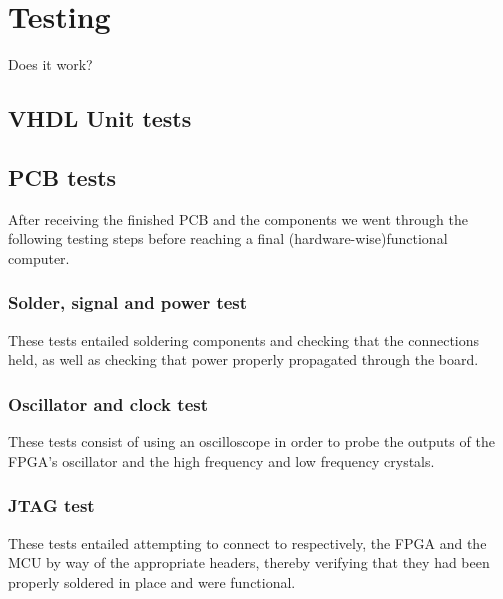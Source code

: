 \chapter{Testing}

Does it work?

\section{VHDL Unit tests}




\section{PCB tests}

After receiving the finished PCB and the components we went through the following testing steps before reaching a final (hardware-wise)functional computer.   

\subsection{Solder, signal and power test}
These tests entailed soldering components and checking that the connections held, as well as checking that power properly propagated through the board.  


\subsection{Oscillator and clock test}
These tests consist of using an oscilloscope in order to probe the outputs of the FPGA's oscillator and the high frequency and low frequency crystals.


\subsection{JTAG test}
These tests entailed attempting to connect to respectively, the FPGA and the MCU by way of the appropriate headers, thereby verifying that they had been properly soldered in place and were functional.

